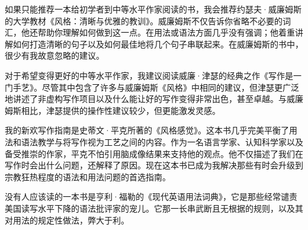 如果只能推荐一本给初学者到中等水平作家阅读的书，我会推荐约瑟夫·威廉姆斯的大学教材《风格：清晰与优雅的教训》。威廉姆斯不仅告诉你省略不必要的词汇，他还帮助你理解如何做到这一点。在用法或语法方面几乎没有强调；他着重讲解如何打造清晰的句子以及如何最佳地将几个句子串联起来。在威廉姆斯的书中，很少有我故意忽略的建议。

对于希望变得更好的中等水平作家，我建议阅读威廉·津瑟的经典之作《写作是一门手艺》。尽管其中包含了许多与威廉姆斯《风格》中相同的建议，但津瑟更广泛地讲述了非虚构写作项目以及什么能让好的写作变得非常出色，甚至卓越。与威廉姆斯相比，津瑟提供的操作性建议较少，但更能激发灵感。

我的新欢写作指南是史蒂文·平克所著的《风格感觉》。这本书几乎完美平衡了用法和语法教学与将写作视为工艺之间的内容。作为一名语言学家、认知科学家以及备受推崇的作家，平克不怕引用脑成像结果来支持他的观点。他不仅描述了我们在写作时会出什么问题，还解释了原因。现在这本书已成为我解决那些有时会升级到宗教狂热程度的语法和用法问题的首选指南。

没有人应该读的一本书是亨利·福勒的《现代英语用法词典》，它是那些经常谴责美国读写水平下降的语法批评家的宠儿。它那一长串武断且无根据的规则，以及其对用法的规定性做法，弊大于利。

